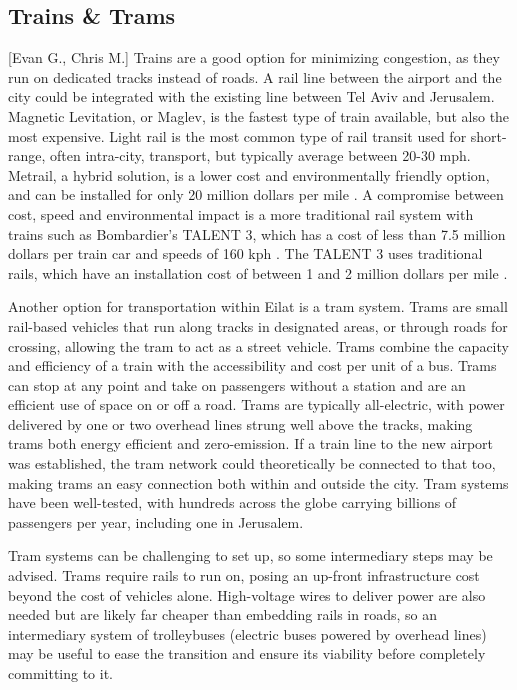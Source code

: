 \documentclass[12pt]{article}                         %
\begin{document}
\subsection{Trains \& Trams}[Evan G., Chris M.]
Trains are a good option for minimizing congestion, as they run on dedicated tracks instead of roads. A rail line between the airport and the city could be integrated with the existing line between Tel Aviv and Jerusalem. Magnetic Levitation, or Maglev, is the fastest type of train available, but also the most expensive. Light rail is the most common type of rail transit used for short-range, often intra-city, transport, but typically average between 20-30 mph. Metrail, a hybrid solution, is a lower cost and environmentally friendly option, and can be installed for only 20 million dollars per mile \cite{MetrailTheSystem}. A compromise between cost, speed and environmental impact is a more traditional rail system with trains such as Bombardier's TALENT 3, which has a cost of less than 7.5 million dollars per train car and speeds of 160 kph \cite{Roy2017Bombardier1.9bn}. The TALENT 3 uses traditional rails, which have an installation cost of between 1 and 2 million dollars per mile \cite{ACWRailwayCompanyCostsSiding}.

Another option for transportation within Eilat is a tram system. Trams are small rail-based vehicles that run along tracks in designated areas, or through roads for crossing, allowing the tram to act as a street vehicle. Trams combine the capacity and efficiency of a train with the accessibility and cost per unit of a bus. Trams can stop at any point and take on passengers without a station and are an efficient use of space on or off a road. Trams are typically all-electric, with power delivered by one or two overhead lines strung well above the tracks, making trams both energy efficient and zero-emission. If a train line to the new airport was established, the tram network could theoretically be connected to that too, making trams an easy connection both within and outside the city. Tram systems have been well-tested, with hundreds across the globe carrying billions of passengers per year, including one in Jerusalem.

Tram systems can be challenging to set up, so some intermediary steps may be advised. Trams require rails to run on, posing an up-front infrastructure cost beyond the cost of vehicles alone. High-voltage wires to deliver power are also needed but are likely far cheaper than embedding rails in roads, so an intermediary system of trolleybuses (electric buses powered by overhead lines) may be useful to ease the transition and ensure its viability before completely committing to it. 
\end{document}
